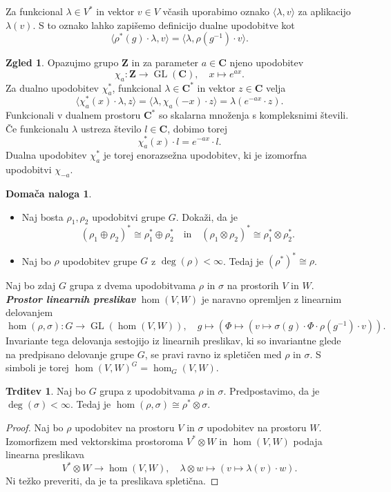 \documentclass[11pt]{book}
\def\ZZ{\mathbf{Z}}
\def\CC{\mathbf{C}}
\DeclareMathOperator\GL{GL}
\def\definicija{\color{rdeca}\bf\em}
\theoremstyle{definition}
\theoremstyle{zgled}
\newtheorem*{zgled}{Zgled}
\theoremstyle{odprtproblem}
\theoremstyle{domacanaloga}
\newtheorem*{domacanaloga}{Domača naloga}
\newenvironment{dokaz}
    {\color{siva}\begin{proof}}
    {\end{proof}}
\theoremstyle{izrek}
\newtheorem*{trditev}{Trditev}
\begin{document}
Za funkcional $\lambda \in V^*$ in vektor $v \in V$ včasih uporabimo oznako $\langle \lambda, v \rangle$ za aplikacijo $\lambda(v)$. S to oznako lahko zapišemo definicijo dualne upodobitve kot
\[
    \langle \rho^*(g) \cdot \lambda, v \rangle = \langle \lambda, \rho(g^{-1}) \cdot v \rangle.
\]

\begin{zgled}
Opazujmo grupo $\ZZ$ in za parameter $a \in \CC$ njeno upodobitev
\[
    \chi_a \colon \ZZ \to \GL(\CC), \quad
    x \mapsto e^{ax}.
\]
Za dualno upodobitev $\chi_a^*$, funkcional $\lambda \in \CC^*$ in vektor $z \in \CC$ velja
\[
    \langle \chi_a^*(x) \cdot \lambda, z \rangle = 
    \langle \lambda, \chi_a(-x) \cdot z \rangle =
    \lambda(e^{-ax} \cdot z).
\]
Funkcionali v dualnem prostoru $\CC^*$ so skalarna množenja s kompleksnimi števili. Če funkcionalu $\lambda$ ustreza število $l \in \CC$, dobimo torej
\[
    \chi_a^*(x) \cdot l = e^{-ax} \cdot l.
\]
Dualna upodobitev $\chi_a^*$ je torej enorazsežna upodobitev, ki je izomorfna upodobitvi $\chi_{-a}$.
\end{zgled}

\begin{domacanaloga} \leavevmode
\begin{itemize}
    \item Naj bosta $\rho_1, \rho_2$ upodobitvi grupe $G$. Dokaži, da je
    \[
        \left( \rho_1 \oplus \rho_2 \right)^* \cong \rho_1^* \oplus \rho_2^*
        \quad \text{in} \quad
        \left( \rho_1 \otimes \rho_2 \right)^* \cong \rho_1^* \otimes \rho_2^*.
        \]
    \item Naj bo $\rho$ upodobitev grupe $G$ z $\deg(\rho) < \infty$. Tedaj je $\left( \rho^* \right)^* \cong \rho$. 
\end{itemize}
\end{domacanaloga}

Naj bo zdaj $G$ grupa z dvema upodobitvama $\rho$ in $\sigma$ na prostorih $V$ in $W$. {\definicija Prostor linearnih preslikav} $\hom(V,W)$ je naravno opremljen z linearnim delovanjem
\[
    \hom(\rho, \sigma) \colon G \to \GL(\hom(V,W)), \quad
    g \mapsto \left( \Phi \mapsto \left( v \mapsto \sigma(g) \cdot \Phi \cdot \rho(g^{-1}) \cdot v \right) \right).
\]
Invariante tega delovanja sestojijo iz linearnih preslikav, ki so invariantne glede na predpisano delovanje grupe $G$, se pravi ravno iz spletičen med $\rho$ in $\sigma$. S simboli je torej $\hom(V,W)^G = \hom_G(V,W)$.

\begin{trditev}
Naj bo $G$ grupa z upodobitvama $\rho$ in $\sigma$. Predpostavimo, da je $\deg(\sigma) < \infty$. Tedaj je $\hom(\rho, \sigma) \cong \rho^* \otimes \sigma$.
\end{trditev}
\begin{dokaz}
Naj bo $\rho$ upodobitev na prostoru $V$ in $\sigma$ upodobitev na prostoru $W$. Izomorfizem med vektorskima prostoroma $V^* \otimes W$ in $\hom(V,W)$ podaja linearna preslikava
\[
    V^* \otimes W \to \hom(V,W), \quad
    \lambda \otimes w \mapsto \left( v \mapsto \lambda(v) \cdot w \right).
\]
Ni težko preveriti, da je ta preslikava spletična.
\end{dokaz}
\end{document}
